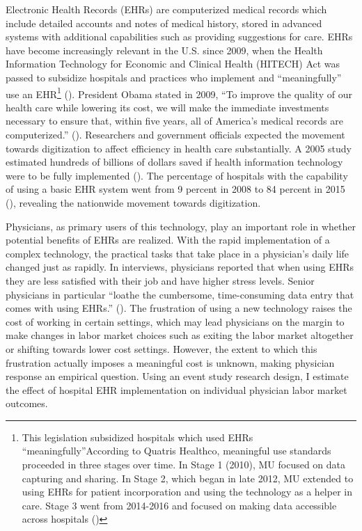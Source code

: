 \documentclass[11pt]{article}
\begin{document}
Electronic Health Records (EHRs) are computerized medical records which include detailed accounts and notes of medical history, stored in advanced systems with additional capabilities such as providing suggestions for care. EHRs have become increasingly relevant in the U.S. since 2009, when the Health Information Technology for Economic and Clinical Health (HITECH) Act was passed to subsidize hospitals and practices who implement and ``meaningfully'' use an EHR\footnote{This legislation subsidized hospitals which used EHRs “meaningfully”According to Quatris Healthco, meaningful use standards proceeded in three stages over time. In Stage 1 (2010), MU focused on data capturing and sharing. In Stage 2, which began in late 2012, MU extended to using EHRs for patient incorporation and using the technology as a helper in care. Stage 3 went from 2014-2016 and focused on making data accessible across hospitals (\cite{meanuse})} (\cite{hitech}). President Obama stated in 2009, “To improve the quality of our health care while lowering its cost, we will make the immediate investments necessary to ensure that, within five years, all of America’s medical records are computerized.” (\cite{presquote}). Researchers and government officials expected the movement towards digitization to affect efficiency in health care substantially. A 2005 study estimated hundreds of billions of dollars saved if health information technology were to be fully implemented (\cite{hillestad2005}). The percentage of hospitals with the capability of using a basic EHR system went from 9 percent in 2008 to 84 percent in 2015 (\cite{stats}), revealing the nationwide movement towards digitization.

Physicians, as primary users of this technology, play an important role in whether potential benefits of EHRs are realized. With the rapid implementation of a complex technology, the practical tasks that take place in a physician's daily life changed just as rapidly. In interviews, physicians reported that when using EHRs they are less satisfied with their job and have higher stress levels. Senior physicians in particular “loathe the cumbersome, time-consuming data entry that comes with using EHRs.” (\cite{CollierBurnout}). The frustration of using a new technology raises the cost of working in certain settings, which may lead physicians on the margin to make changes in labor market choices such as exiting the labor market altogether or shifting towards lower cost settings. However, the extent to which this frustration actually imposes a meaningful cost is unknown, making physician response an empirical question. Using an event study research design, I estimate the effect of hospital EHR implementation on individual physician labor market outcomes.
\end{document}
